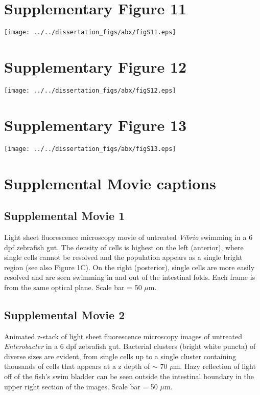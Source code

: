 \newpage
\section*{Supplementary Figure 11}

\begin{figure*}[h!]
	\centerline{
		\texttt{[image: ../../dissertation\_figs/abx/figS11.eps]}} 
	
\end{figure*}

\newpage
\section*{Supplementary Figure 12}

\begin{figure*}[h!]
	\centerline{
		\texttt{[image: ../../dissertation\_figs/abx/figS12.eps]}} 
	
\end{figure*}

\newpage
\section*{Supplementary Figure 13}

\begin{figure*}[h!]
	\centerline{
		\texttt{[image: ../../dissertation\_figs/abx/figS13.eps]}} 
	
\end{figure*}
\newpage

\section*{Supplemental Movie captions}

\subsection*{Supplemental Movie 1} 
Light sheet fluorescence microscopy movie of untreated \textit{Vibrio} swimming in a 6 dpf zebrafish gut. The density of cells is highest on the left (anterior), where single cells cannot be resolved and the population appears as a single bright region (see also Figure 1C). On the right (posterior), single cells are more easily resolved and are seen swimming in and out of the intestinal folds. Each frame is from the same optical plane. Scale bar = 50 $\mu$m.

\subsection*{Supplemental Movie 2} 
Animated z-stack of light sheet fluorescence microscopy images of untreated \textit{Enterobacter} in a 6 dpf zebrafish gut. Bacterial clusters (bright white puncta) of diverse sizes are evident, from single cells up to a single cluster containing thousands of cells that appears at a z depth of $\sim$ 70 $\mu$m. Hazy reflection of light off of the fish's swim bladder can be seen outside the intestinal boundary in the upper right section of the images. Scale bar = 50 $\mu$m.

